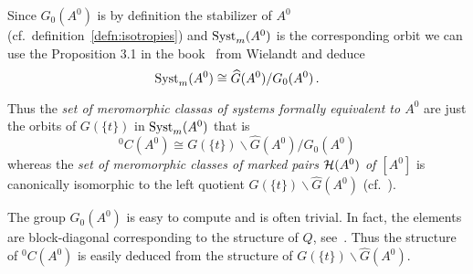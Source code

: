 \begin{lem}
  Since $G_0(A^0)$ is by definition the stabilizer of $A^0$ (cf.\
  definition~\ref{defn:isotropies}) and $\operatorname{Syst}_m(A^0)$ is the corresponding
  orbit we can use the Proposition 3.1 in the
  book~\cite{wielandt1964finite} from Wielandt and deduce
  \[
    \operatorname{Syst}_m(A^0)\cong \widehat G(A^0)/G_0(A^0) \,.
  \]
  \begin{s-cor}\label{cor:isomorphyOfClassfset}
    Thus the \emph{set of meromorphic classas of systems formally equivalent
    to $A^0$} are just the orbits of $G(\!\{t\}\!)$ in $\operatorname{Syst}_m(A^0)$ that is
    \[
      {}^0C(A^0)\cong G(\!\{t\}\!)\backslash\hat G(A^0)/G_0(A^0)
    \]
    whereas the \emph{set of meromorphic classes of marked pairs $\mathcal{H}(A^0)$
    of $[A^0]$} is canonically isomorphic to the left quotient
    $G(\!\{t\}\!)\backslash\hat G(A^0)$ (cf.\ \cite[Lem.1.17]{thboalch}).
  \end{s-cor}
\end{lem}

The group $G_0(A^0)$ is easy to compute and is often trivial. In fact, the
elements are block-diagonal corresponding to the structure of $Q$,
see~\cite[77]{Loday2014}.
Thus the structure of ${}^0C(A^0)$ is easily deduced from the structure of
$G(\!\{t\}\!)\backslash\hat G(A^0)$.
